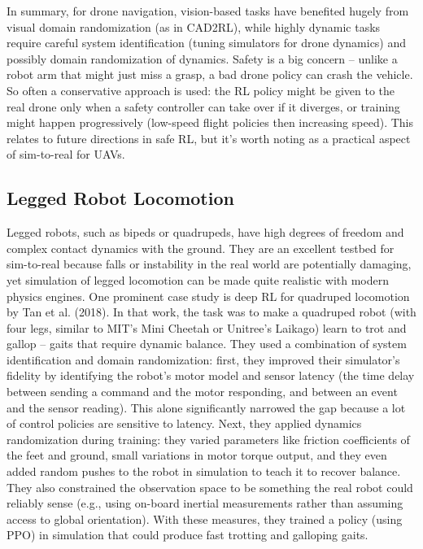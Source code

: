 In summary, for drone navigation, vision-based tasks have benefited hugely from visual domain randomization (as in CAD2RL), while highly dynamic tasks require careful system identification (tuning simulators for drone dynamics) and possibly domain randomization of dynamics. Safety is a big concern – unlike a robot arm that might just miss a grasp, a bad drone policy can crash the vehicle. So often a conservative approach is used: the RL policy might be given to the real drone only when a safety controller can take over if it diverges, or training might happen progressively (low-speed flight policies then increasing speed). This relates to future directions in safe RL, but it’s worth noting as a practical aspect of sim-to-real for UAVs.

\subsection{Legged Robot Locomotion}
Legged robots, such as bipeds or quadrupeds, have high degrees of freedom and complex contact dynamics with the ground. They are an excellent testbed for sim-to-real because falls or instability in the real world are potentially damaging, yet simulation of legged locomotion can be made quite realistic with modern physics engines. One prominent case study is deep RL for quadruped locomotion by Tan et al. (2018). In that work, the task was to make a quadruped robot (with four legs, similar to MIT’s Mini Cheetah or Unitree’s Laikago) learn to trot and gallop – gaits that require dynamic balance. They used a combination of system identification and domain randomization: first, they improved their simulator’s fidelity by identifying the robot’s motor model and sensor latency (the time delay between sending a command and the motor responding, and between an event and the sensor reading). This alone significantly narrowed the gap because a lot of control policies are sensitive to latency. Next, they applied dynamics randomization during training: they varied parameters like friction coefficients of the feet and ground, small variations in motor torque output, and they even added random pushes to the robot in simulation to teach it to recover balance. They also constrained the observation space to be something the real robot could reliably sense (e.g., using on-board inertial measurements rather than assuming access to global orientation). With these measures, they trained a policy (using PPO) in simulation that could produce fast trotting and galloping gaits.

